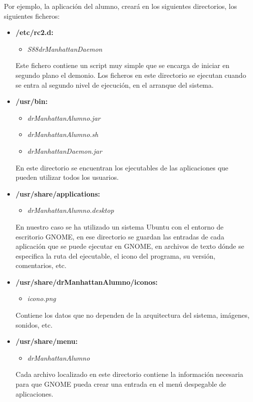 Por ejemplo, la aplicación del alumno, creará en los siguientes directorios, los siguientes ficheros:

\begin{itemize}

    \item {\bfseries /etc/rc2.d:}
    \begin{itemize}
        \item \emph{S88drManhattanDaemon}
    \end{itemize}

    Este fichero contiene un script muy simple que se encarga de iniciar en segundo plano el demonio. Los ficheros en este directorio se ejecutan cuando se entra al segundo nivel de ejecución, en el arranque del sistema.


    \item {\bfseries /usr/bin:}
    \begin{itemize}
        \item \emph{drManhattanAlumno.jar}
        \item \emph{drManhattanAlumno.sh}
        \item \emph{drManhattanDaemon.jar}
    \end{itemize}

    En este directorio se encuentran los ejecutables de las aplicaciones que pueden utilizar todos los usuarios.

    \item {\bfseries /usr/share/applications:}
    \begin{itemize}
        \item \emph{drManhattanAlumno.desktop}
    \end{itemize}

    En nuestro caso se ha utilizado un sistema Ubuntu con el entorno de escritorio GNOME, en ese directorio se guardan las entradas de cada aplicación que se puede ejecutar en GNOME, en archivos de texto dónde se especifica la ruta del ejecutable, el icono del programa, su versión, comentarios, etc.


    \item {\bfseries /usr/share/drManhattanAlumno/iconos:}
    \begin{itemize}
        \item \emph{icono.png}
    \end{itemize}

    Contiene los datos que no dependen de la arquitectura del sistema, imágenes, sonidos, etc.

    \item {\bfseries /usr/share/menu:}
        \begin{itemize}
            \item \emph{drManhattanAlumno}
        \end{itemize}

    Cada archivo localizado en este directorio contiene la información necesaria para que GNOME pueda crear una entrada en el menú despegable de aplicaciones.

\end{itemize}



